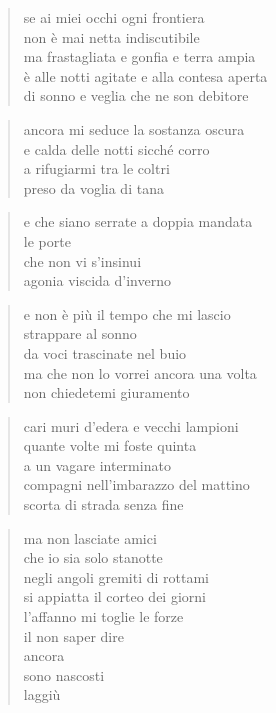 \begin{verse}
    se ai miei occhi ogni frontiera\\
    non è mai netta indiscutibile\\
    ma frastagliata e gonfia e terra ampia\\
    è alle notti agitate e alla contesa aperta\\
    di sonno e veglia che ne son debitore
\end{verse}

\clearpage


\begin{verse}
    ancora mi seduce la sostanza oscura\\
    e calda delle notti sicché corro\\
    a rifugiarmi tra le coltri\\
    preso da voglia di tana
\end{verse}

\begin{verse}
    e che siano serrate a doppia mandata\\
    le porte\\
    che non vi s'insinui\\
    agonia viscida d'inverno
\end{verse}

\begin{verse}
    e non è più il tempo che mi lascio\\
    strappare al sonno\\
    da voci trascinate nel buio\\
    ma che non lo vorrei ancora una volta\\
    non chiedetemi giuramento
\end{verse}

\clearpage


\begin{verse}
    cari muri d’edera e vecchi lampioni\\
    quante volte mi foste quinta\\
    a un vagare interminato\\
    compagni nell’imbarazzo del mattino\\
    scorta di strada senza fine
\end{verse}

\begin{verse}
    ma non lasciate amici\\
    che io sia solo stanotte\\
    negli angoli gremiti di rottami\\
    si appiatta il corteo dei giorni\\
    l’affanno mi toglie le forze\\
    il non saper dire\\
    ancora\\
    sono nascosti\\
    laggiù
\end{verse}

